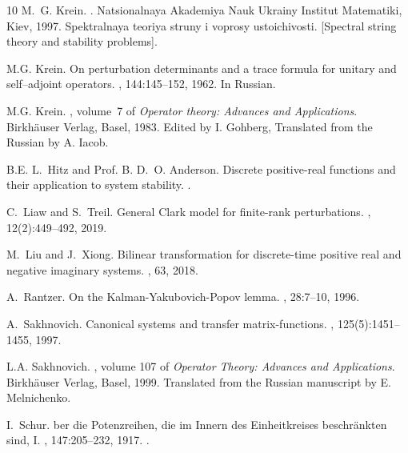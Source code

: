 \documentclass[12pt]{amsart}
\theoremstyle{definition}
\theoremstyle{remark}
\numberwithin{equation}{section}
\begin{document}
\begin{thebibliography}{10}
M.~G. Krein.
.
\newblock Natsionalnaya Akademiya Nauk Ukrainy Institut Matematiki,
  Kiev, 1997.
\newblock Spektralnaya teoriya struny i voprosy ustoichivosti. [Spectral string
  theory and stability problems].

M.G. Krein.
\newblock On perturbation determinants and a trace formula for unitary and
  self--adjoint operators.
, 144:145--152, 1962.
\newblock In {R}ussian.

M.G. Krein.
, volume~7 of {\em Operator theory: {A}dvances and {A}pplications}.
\newblock Birkh\"auser Verlag, Basel, 1983.
\newblock Edited by I. Gohberg, Translated from the Russian by A. Iacob.

B.E. L.~Hitz and Prof. B. D.~O. Anderson.
\newblock Discrete positive-real functions and their application to system
  stability.
.

C.~Liaw and S.~Treil.
\newblock General {C}lark model for finite-rank perturbations.
, 12(2):449--492, 2019.

M.~Liu and J.~Xiong.
\newblock Bilinear transformation for discrete-time positive real and negative
  imaginary systems.
, 63, 2018.

A.~Rantzer.
\newblock On the {Kalman-Yakubovich-Popov} lemma.
, 28:7--10, 1996.

A.~Sakhnovich.
\newblock Canonical systems and transfer matrix-functions.
, 125(5):1451--1455, 1997.

L.A. Sakhnovich.
, volume 107 of {\em Operator Theory: Advances and
  Applications}.
\newblock Birkh\"auser Verlag, Basel, 1999.
\newblock Translated from the Russian manuscript by E. Melnichenko.

I.~Schur.
ber die {P}otenzreihen, die im {Innern des Einheitkreises
  beschr{\" a}nkten sind, {I}}.
,
  147:205--232, 1917.
.


\end{thebibliography}
\end{document}
